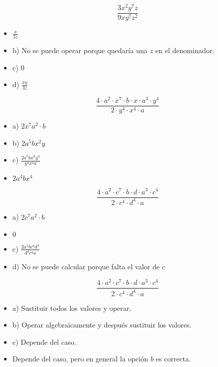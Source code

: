 \[
	\frac{3x^2y^7z}{9xy^7z^2}
\]

\begin{itemize}
	\item {} $\frac{x}{3z}$
	\item b) No se puede operar porque quedaría una $z$ en el denominador.
	\item c) $0$
	\item d) $\frac{xy}{3z}$
\end{itemize}


\[
	\frac{4·a^2·x^7·b·x·a^3·y^4}{2·y^4·x^4·a}
\]

\begin{itemize}
	\item a) $2x^7a^2·b$
	\item b) $2a^5bx^2y$
	\item c) $\frac{2a^5bx^8y^4}{y^4x^4a}$
	\item {} $2a^4bx^4$
\end{itemize}


\[
	\frac{4·a^2·c^7·b·d·a^3·c^4}{2·c^4·d^4·a}
\]

\begin{itemize}
	\item a) $2c^7a^2·b$
	\item {} $0$
	\item c) $\frac{2a^5bc^8d^4}{d^4c^4a}$
	\item d) No se puede calcular porque falta el valor de $c$
\end{itemize}

\[
	\frac{4·a^2·c^7·b·d·a^3·c^4}{2·c^4·d^4·a}
\]

\begin{itemize}
	\item a) Sustituir todos los valores y operar.
	\item b) Operar algebraicamente y después sustituir los valores.
	\item c) Depende del caso.
	\item {} Depende del caso, pero en general la opción $b$ es correcta.
\end{itemize}

